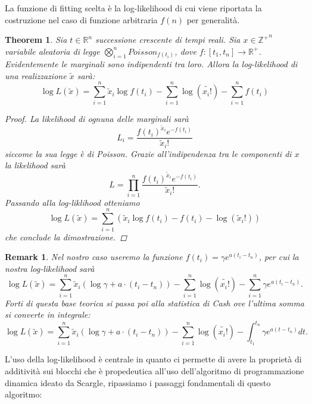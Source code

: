 \documentclass[10pt,a4paper]{report}
\newtheorem{theorem}{Theorem}
\newtheorem{remark}{Remark}
\begin{document}
La funzione di fitting scelta è la log-likelihood di cui viene riportata la costruzione nel caso di funzione arbitraria $f(n)$ per generalità.
\begin{theorem}
Sia $t\in\mathbb{R}^n$ successione crescente di tempi reali.
Sia $x\in\mathbb{Z^+}^n$ variabile aleatoria di legge $\bigotimes_{i=1}^{n}Poisson_{f(t_i)}$, dove $f:[t_1,t_n]\rightarrow\mathbb{R}^+$. Evidentemente le marginali sono indipendenti tra loro. Allora la log-likelihood di una realizzazione $\tilde{x}$ sarà:
$$
\log L(\tilde{x}) = \sum_{i=1}^n\tilde{x}_i\log f(t_i) -\sum_{i=1}^n \log(\tilde{x_i!})-\sum_{i=1}^nf(t_i)
$$
\begin{proof}
La likelihood di ognuna delle marginali sarà 
$$
L_i = \frac{f(t_i)^{\tilde{x}_i}e^{-f(t_i)}}{\tilde{x}_i!}
$$
siccome la sua legge è di Poisson. Grazie all'indipendenza tra le componenti di $x$ la likelihood sarà
$$
L = \prod_{i=1}^{n}\frac{f(t_i)^{\tilde{x}_i}e^{-f(t_i)}}{\tilde{x}_i!}.
$$
Passando alla log-liklihood otteniamo
$$
\log L(\tilde{x}) = \sum_{i=1}^{n}\left(\tilde{x}_i\log f(t_i)-f(t_i) -\log(\tilde{x}_i!)\right)
$$
che conclude la dimostrazione.
\end{proof}
\end{theorem}
\begin{remark}
Nel nostro caso useremo la funzione $f(t_i) = \gamma e^{a(t_i-t_n)}$, per cui la nostra log-likelihood sarà
\begin{equation*}
\log L(\tilde{x}) = \sum_{i=1}^n\tilde{x}_i(\log\gamma + a\cdot(t_i-t_n)) -\sum_{i=1}^n \log(\tilde{x_i!})-\sum_{i=1}^n\gamma e^{a(t_i-t_n)}.
\end{equation*}
Forti di questa base teorica si passa poi alla statistica di Cash ove l'ultima somma si converte in integrale:
\begin{equation}
\log L(\tilde{x}) = \sum_{i=1}^n\tilde{x}_i(\log\gamma + a\cdot(t_i-t_n)) -\sum_{i=1}^n \log(\tilde{x_i!})-\int_{t_1}^{t_n}\gamma e^{a(t-t_n)} dt.
\end{equation}
\end{remark}
L'uso della log-likelihood è centrale in quanto ci permette di avere la proprietà di additività sui blocchi che è propedeutica all'uso dell'algoritmo di programmazione dinamica ideato da Scargle, ripassiamo i passaggi fondamentali di questo algoritmo:
\end{document}
